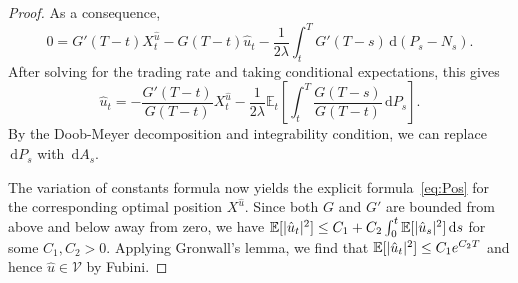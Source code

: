 \documentclass[11pt]{article}
\theoremstyle{definition}
\theoremstyle{remark}
\newcommand{\E}{\mathbb{E}} %
\DeclarePairedDelimiter{\abs}{\lvert}{\rvert} %
\newcommand{\ts}{\textstyle}
\newcommand{\de}{\,\mathrm{d}}
\begin{document}
\begin{proof}
As a consequence,
$$
0=G'(T-t)X^{\hat{u}}_t-G(T-t)\hat{u}_t-\frac{1}{2\lambda}\int_t^T G'(T-s) \de (P_s-N_s).
$$
After solving for the trading rate and taking conditional expectations, this gives
$$
\hat{u}_t = -\frac{G'(T-t)}{G(T-t)} X^{\hat{u}}_t - \frac{1}{2\lambda} \E_t\left[\int_t^T\frac{G(T-s)}{G(T-t)} \de P_s\right].
$$
By the Doob-Meyer decomposition and integrability condition, we can replace $\de P_s$ with $\de A_s$.

The variation of constants formula now yields the explicit formula~\eqref{eq:Pos} for the corresponding optimal position $X^{\hat{u}}$.
Since both $G$ and $G'$ are bounded from above and below away from zero, we have $\E[\abs{\hat{u}_t}^2] \le C_1 +C_2\int_0^t \E[\abs{\hat{u}_s}^2] \de s$ for some $C_1, C_2 > 0$. Applying Gronwall's lemma, we find that $\E[\abs{\hat{u}_t}^2]\le C_1 e^{C_2 T}$ and hence $\hat{u}\in\mathcal V$ by Fubini.



\end{proof}
\end{document}
